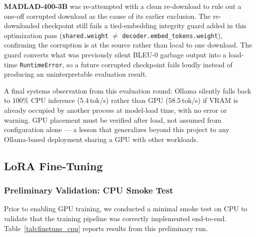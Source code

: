 \documentclass[conference]{IEEEtran}
\begin{document}
\textbf{MADLAD-400-3B} was re-attempted with a clean re-download to rule out a
one-off corrupted download as the cause of its earlier exclusion. The re-downloaded
checkpoint still fails a tied-embedding integrity guard added in this optimization
pass (\texttt{shared.weight} $\neq$ \texttt{decoder.embed\_tokens.weight}), confirming
the corruption is at the source rather than local to one download. The guard
converts what was previously silent BLEU-0 garbage output into a load-time
\texttt{RuntimeError}, so a future corrupted checkpoint fails loudly instead of
producing an uninterpretable evaluation result.

A final systems observation from this evaluation round: Ollama silently falls back
to 100\% CPU inference (5.4\,tok/s) rather than GPU (58.5\,tok/s) if VRAM is already
occupied by another process at model-load time, with no error or warning. GPU
placement must be verified after load, not assumed from configuration alone ---
a lesson that generalizes beyond this project to any Ollama-based deployment
sharing a GPU with other workloads.

\subsection{LoRA Fine-Tuning}
\label{sec:lora_ft}

\subsubsection{Preliminary Validation: CPU Smoke Test}

Prior to enabling GPU training, we conducted a minimal smoke test on CPU to
validate that the training pipeline was correctly implemented end-to-end.
Table~\ref{tab:finetune_cpu} reports results from this preliminary run.
\end{document}
